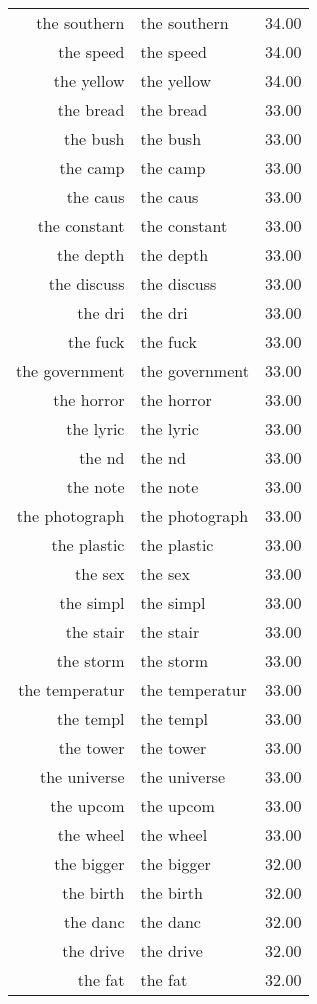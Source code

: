 \begin{table}[ht]
\begin{tabular}{rlr}
  the southern & the southern & 34.00 \\ 
  the speed & the speed & 34.00 \\ 
  the yellow & the yellow & 34.00 \\ 
  the bread & the bread & 33.00 \\ 
  the bush & the bush & 33.00 \\ 
  the camp & the camp & 33.00 \\ 
  the caus & the caus & 33.00 \\ 
  the constant & the constant & 33.00 \\ 
  the depth & the depth & 33.00 \\ 
  the discuss & the discuss & 33.00 \\ 
  the dri & the dri & 33.00 \\ 
  the fuck & the fuck & 33.00 \\ 
  the government & the government & 33.00 \\ 
  the horror & the horror & 33.00 \\ 
  the lyric & the lyric & 33.00 \\ 
  the nd & the nd & 33.00 \\ 
  the note & the note & 33.00 \\ 
  the photograph & the photograph & 33.00 \\ 
  the plastic & the plastic & 33.00 \\ 
  the sex & the sex & 33.00 \\ 
  the simpl & the simpl & 33.00 \\ 
  the stair & the stair & 33.00 \\ 
  the storm & the storm & 33.00 \\ 
  the temperatur & the temperatur & 33.00 \\ 
  the templ & the templ & 33.00 \\ 
  the tower & the tower & 33.00 \\ 
  the universe & the universe & 33.00 \\ 
  the upcom & the upcom & 33.00 \\ 
  the wheel & the wheel & 33.00 \\ 
  the bigger & the bigger & 32.00 \\ 
  the birth & the birth & 32.00 \\ 
  the danc & the danc & 32.00 \\ 
  the drive & the drive & 32.00 \\ 
  the fat & the fat & 32.00 \\ 

\end{tabular}
\end{table}
